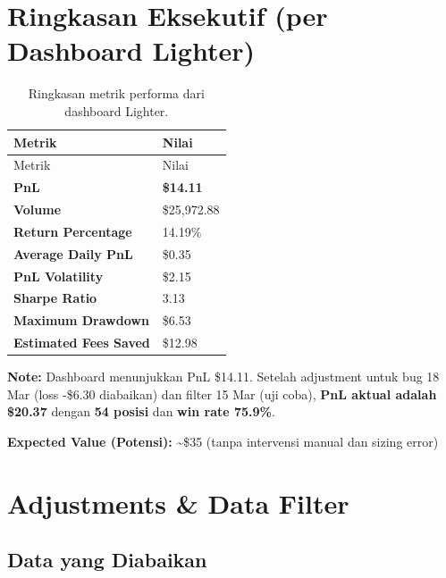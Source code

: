 \documentclass[
  11pt,
  a4paper,
]{article}
\begin{document}
\section{Ringkasan Eksekutif (per Dashboard
Lighter)}\label{ringkasan-eksekutif-per-dashboard-lighter}

\begin{longtable}[]{@{}ll@{}}
\caption{Ringkasan metrik performa dari dashboard
Lighter.}\label{tbl-executive}\tabularnewline
\toprule\noalign{}
Metrik & Nilai \\
\midrule\noalign{}
\endfirsthead
\toprule\noalign{}
Metrik & Nilai \\
\midrule\noalign{}
\endhead
\bottomrule\noalign{}
\endlastfoot
\textbf{PnL} & \textbf{\$14.11} \\
\textbf{Volume} & \$25,972.88 \\
\textbf{Return Percentage} & 14.19\% \\
\textbf{Average Daily PnL} & \$0.35 \\
\textbf{PnL Volatility} & \$2.15 \\
\textbf{Sharpe Ratio} & 3.13 \\
\textbf{Maximum Drawdown} & \$6.53 \\
\textbf{Estimated Fees Saved} & \$12.98 \\
\end{longtable}

\textbf{Note:} Dashboard menunjukkan PnL \$14.11. Setelah adjustment
untuk bug 18 Mar (loss -\$6.30 diabaikan) dan filter 15 Mar (uji coba),
\textbf{PnL aktual adalah \$20.37} dengan \textbf{54 posisi} dan
\textbf{win rate 75.9\%}.

\textbf{Expected Value (Potensi):} \textasciitilde\$35 (tanpa intervensi
manual dan sizing error)

\newpage

\section{Adjustments \& Data Filter}\label{adjustments-data-filter}

\subsection{Data yang Diabaikan}\label{data-yang-diabaikan}
\end{document}
